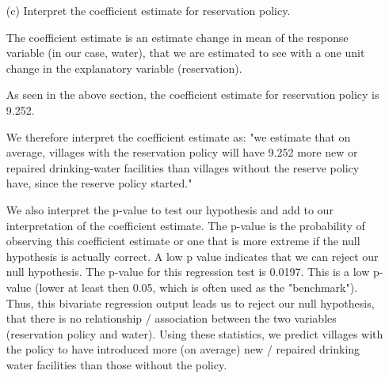 \documentclass[12pt,letterpaper]{article}
\begin{document}
\begin{enumerate}
\begin{verbatim}
	\end{verbatim}
	
	\vspace{6cm}
	\item [(c)] Interpret the coefficient estimate for reservation policy. 
	
	The coefficient estimate is an estimate change in mean of the response variable (in our case, water), that we are estimated to see with a one unit change in the explanatory variable (reservation). 
	
	As seen in the above section, the coefficient estimate for reservation policy is 9.252.
	
	 We therefore interpret the coefficient estimate as: "we estimate that on average, villages with the reservation policy will have 9.252 more new or repaired drinking-water facilities than villages without the reserve policy have, since the reserve policy started."
	 
	We also interpret the p-value to test our hypothesis and add to our interpretation of the coefficient estimate. The p-value is the probability of observing this coefficient estimate or one that is more extreme if the null hypothesis is actually correct. A low p value indicates that we can reject our null hypothesis.  The p-value for this regression test is 0.0197. This is a low p-value (lower at least then 0.05, which is often used as the "benchmark"). Thus, this bivariate regression output leads us to reject our null hypothesis, that there is no relationship / association between the two variables (reservation policy and water). Using these statistics, we predict villages with the policy to have introduced more (on average) new / repaired drinking water facilities than those without the policy. 
	

	
	
\end{enumerate}
\end{document}
